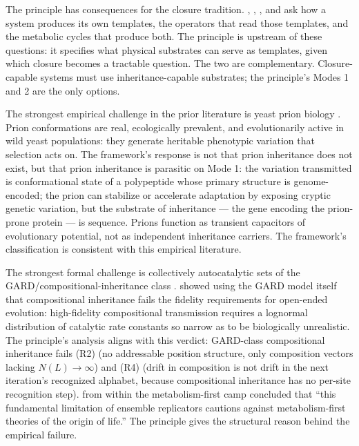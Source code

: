 \documentclass[aps,prx,reprint,amsmath,amssymb,floatfix,superscriptaddress,nofootinbib]{revtex4-2}
\theoremstyle{plain-thm}
\theoremstyle{definition-thm}
\begin{document}
The principle has consequences for the closure tradition. \citet{Rosen1958}, \citet{MaturanaVarela1972}, \citet{Pattee1972}, and \citet{Hofmeyr2017} ask how a system produces its own templates, the operators that read those templates, and the metabolic cycles that produce both. The principle is upstream of these questions: it specifies what physical substrates can serve as templates, given which closure becomes a tractable question. The two are complementary. Closure-capable systems must use inheritance-capable substrates; the principle's Modes 1 and 2 are the only options.

The strongest empirical challenge in the prior literature is yeast prion biology \citep{HalfmannLindquist2010, Halfmann2012}. Prion conformations are real, ecologically prevalent, and evolutionarily active in wild yeast populations: they generate heritable phenotypic variation that selection acts on. The framework's response is not that prion inheritance does not exist, but that prion inheritance is parasitic on Mode 1: the variation transmitted is conformational state of a polypeptide whose primary structure is genome-encoded; the prion can stabilize or accelerate adaptation by exposing cryptic genetic variation, but the substrate of inheritance --- the gene encoding the prion-prone protein --- is sequence. Prions function as transient capacitors of evolutionary potential, not as independent inheritance carriers. The framework's classification is consistent with this empirical literature.

The strongest formal challenge is collectively autocatalytic sets of the GARD/compositional-inheritance class \citep{Kauffman1986, Hordijk2012}. \citet{Vasas2010} showed using the GARD model itself that compositional inheritance fails the fidelity requirements for open-ended evolution: high-fidelity compositional transmission requires a lognormal distribution of catalytic rate constants so narrow as to be biologically unrealistic. The principle's analysis aligns with this verdict: GARD-class compositional inheritance fails (R2) (no addressable position structure, only composition vectors lacking $N(L) \to \infty$) and (R4) (drift in composition is not drift in the next iteration's recognized alphabet, because compositional inheritance has no per-site recognition step). \citet{Vasas2010} from within the metabolism-first camp concluded that ``this fundamental limitation of ensemble replicators cautions against metabolism-first theories of the origin of life.'' The principle gives the structural reason behind the empirical failure.
\end{document}
